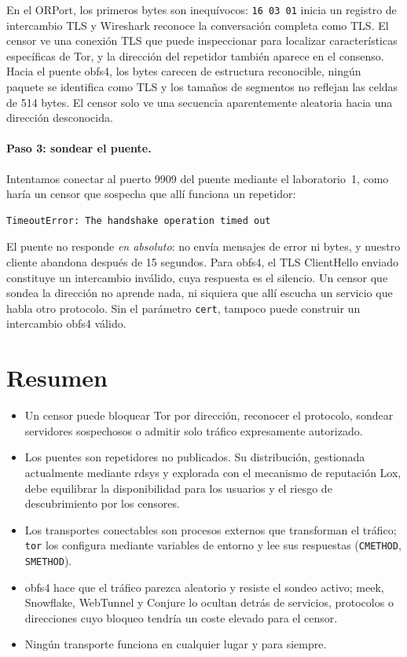 En el ORPort, los primeros bytes son inequívocos: \texttt{16 03 01} inicia un registro de intercambio TLS y Wireshark reconoce la conversación completa como TLS. El censor ve una conexión TLS que puede inspeccionar para localizar características específicas de Tor, y la dirección del repetidor también aparece en el consenso. Hacia el puente obfs4, los bytes carecen de estructura reconocible, ningún paquete se identifica como TLS y los tamaños de segmentos no reflejan las celdas de 514 bytes. El censor solo ve una secuencia aparentemente aleatoria hacia una dirección desconocida.

\paragraph{Paso 3: sondear el puente.} Intentamos conectar al puerto 9909 del puente mediante el laboratorio~1, como haría un censor que sospecha que allí funciona un repetidor:
\begin{lstlisting}[numbers=none]
TimeoutError: The handshake operation timed out
\end{lstlisting}

El puente no responde \emph{en absoluto}: no envía mensajes de error ni bytes, y nuestro cliente abandona después de 15 segundos. Para obfs4, el TLS ClientHello enviado constituye un intercambio inválido, cuya respuesta es el silencio. Un censor que sondea la dirección no aprende nada, ni siquiera que allí escucha un servicio que habla otro protocolo. Sin el parámetro \texttt{cert}, tampoco puede construir un intercambio obfs4 válido.

\section*{Resumen}
\begin{itemize}
  \item Un censor puede bloquear Tor por dirección, reconocer el protocolo, sondear servidores sospechosos o admitir solo tráfico expresamente autorizado.
  \item Los puentes son repetidores no publicados. Su distribución, gestionada actualmente mediante rdsys y explorada con el mecanismo de reputación Lox, debe equilibrar la disponibilidad para los usuarios y el riesgo de descubrimiento por los censores.
  \item Los transportes conectables son procesos externos que transforman el tráfico; \texttt{tor} los configura mediante variables de entorno y lee sus respuestas (\texttt{CMETHOD}, \texttt{SMETHOD}).
  \item obfs4 hace que el tráfico parezca aleatorio y resiste el sondeo activo; meek, Snowflake, WebTunnel y Conjure lo ocultan detrás de servicios, protocolos o direcciones cuyo bloqueo tendría un coste elevado para el censor.
  \item Ningún transporte funciona en cualquier lugar y para siempre.
\end{itemize}

